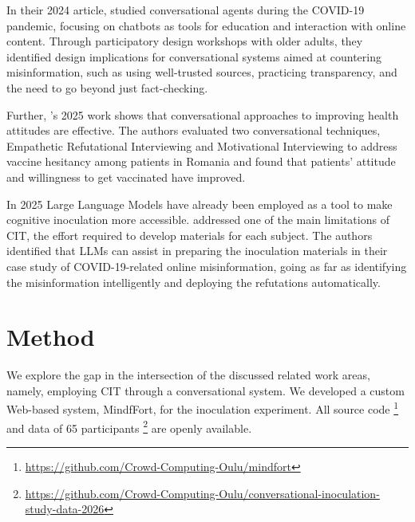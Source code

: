 \documentclass[sigconf]{acmart}
\begin{document}
In their 2024 article, \citet{Peng_Lee_Lim_2024} studied conversational agents during the COVID-19 pandemic, focusing on chatbots as tools for education and interaction with online content.
Through participatory design workshops with older adults, they identified design implications for conversational systems aimed at countering misinformation, such as using well-trusted sources, practicing transparency, and the need to go beyond just fact-checking.

Further, \citeauthor{Fasce_2025}'s 2025 work \cite{Fasce_2025} shows that conversational approaches to improving health attitudes are effective.
The authors evaluated two conversational techniques, Empathetic Refutational Interviewing and Motivational Interviewing to address vaccine hesitancy among patients in Romania and found that patients' attitude and willingness to get vaccinated have improved.

In 2025 Large Language Models have already been employed as a tool to make cognitive inoculation more accessible. \citet{Malek_2025} addressed one of the main limitations of CIT, the effort required to develop materials for each subject.
The authors identified that LLMs can assist in preparing the inoculation materials in their case study of COVID-19-related online misinformation, going as far as identifying the misinformation intelligently and deploying the refutations automatically.

\section{Method}

We explore the gap in the intersection of the discussed related work areas, namely, employing CIT through a conversational system.
We developed a custom Web-based system, MindfFort, for the inoculation experiment.
All source code \footnote{\url{https://github.com/Crowd-Computing-Oulu/mindfort}} and data of 65 participants \footnote{\url{https://github.com/Crowd-Computing-Oulu/conversational-inoculation-study-data-2026}}
are openly available.
\end{document}
